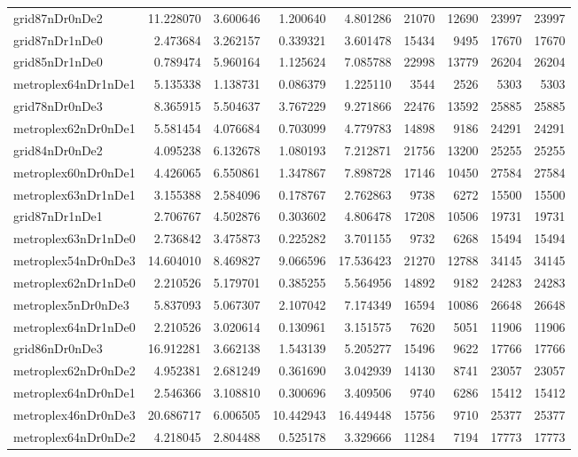 \begin{longtable}{|l|r|r|r|r|r|r|r|r|}
grid87nDr0nDe2 & 11.228070 & 3.600646 & 1.200640 & 4.801286 & 21070 & 12690 & 23997 & 23997 \\
grid87nDr1nDe0 & 2.473684 & 3.262157 & 0.339321 & 3.601478 & 15434 & 9495 & 17670 & 17670 \\
grid85nDr1nDe0 & 0.789474 & 5.960164 & 1.125624 & 7.085788 & 22998 & 13779 & 26204 & 26204 \\
metroplex64nDr1nDe1 & 5.135338 & 1.138731 & 0.086379 & 1.225110 & 3544 & 2526 & 5303 & 5303 \\
grid78nDr0nDe3 & 8.365915 & 5.504637 & 3.767229 & 9.271866 & 22476 & 13592 & 25885 & 25885 \\
metroplex62nDr0nDe1 & 5.581454 & 4.076684 & 0.703099 & 4.779783 & 14898 & 9186 & 24291 & 24291 \\
grid84nDr0nDe2 & 4.095238 & 6.132678 & 1.080193 & 7.212871 & 21756 & 13200 & 25255 & 25255 \\
metroplex60nDr0nDe1 & 4.426065 & 6.550861 & 1.347867 & 7.898728 & 17146 & 10450 & 27584 & 27584 \\
metroplex63nDr1nDe1 & 3.155388 & 2.584096 & 0.178767 & 2.762863 & 9738 & 6272 & 15500 & 15500 \\
grid87nDr1nDe1 & 2.706767 & 4.502876 & 0.303602 & 4.806478 & 17208 & 10506 & 19731 & 19731 \\
metroplex63nDr1nDe0 & 2.736842 & 3.475873 & 0.225282 & 3.701155 & 9732 & 6268 & 15494 & 15494 \\
metroplex54nDr0nDe3 & 14.604010 & 8.469827 & 9.066596 & 17.536423 & 21270 & 12788 & 34145 & 34145 \\
metroplex62nDr1nDe0 & 2.210526 & 5.179701 & 0.385255 & 5.564956 & 14892 & 9182 & 24283 & 24283 \\
metroplex5nDr0nDe3 & 5.837093 & 5.067307 & 2.107042 & 7.174349 & 16594 & 10086 & 26648 & 26648 \\
metroplex64nDr1nDe0 & 2.210526 & 3.020614 & 0.130961 & 3.151575 & 7620 & 5051 & 11906 & 11906 \\
grid86nDr0nDe3 & 16.912281 & 3.662138 & 1.543139 & 5.205277 & 15496 & 9622 & 17766 & 17766 \\
metroplex62nDr0nDe2 & 4.952381 & 2.681249 & 0.361690 & 3.042939 & 14130 & 8741 & 23057 & 23057 \\
metroplex64nDr0nDe1 & 2.546366 & 3.108810 & 0.300696 & 3.409506 & 9740 & 6286 & 15412 & 15412 \\
metroplex46nDr0nDe3 & 20.686717 & 6.006505 & 10.442943 & 16.449448 & 15756 & 9710 & 25377 & 25377 \\
metroplex64nDr0nDe2 & 4.218045 & 2.804488 & 0.525178 & 3.329666 & 11284 & 7194 & 17773 & 17773 \\

\end{longtable}

